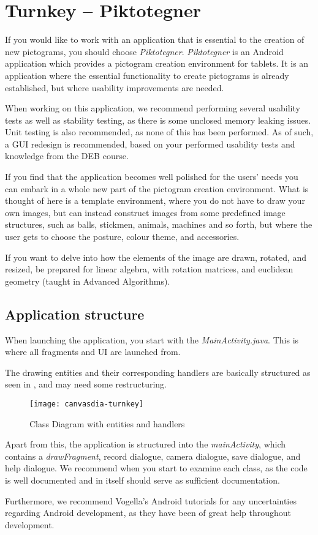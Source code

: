 \chapter{Turnkey -- Piktotegner}
If you would like to work with an application that is essential to the creation of new pictograms, you should choose \textit{Piktotegner}.
\textit{Piktotegner} is an Android application which provides a pictogram creation environment for tablets.
It is an application where the essential functionality to create pictograms is already established, but where usability improvements are needed.

When working on this application, we recommend performing several usability tests as well as stability testing, as there is some unclosed memory leaking issues.
Unit testing is also recommended, as none of this has been performed.
As of such, a GUI redesign is recommended, based on your performed usability tests and knowledge from the DEB course.

If you find that the application becomes well polished for the users' needs you can embark in a whole new part of the pictogram creation environment.
What is thought of here is a template environment, where you do not have to draw your own images, but can instead construct images from some predefined image structures, such as balls, stickmen, animals, machines and so forth, but where the user gets to choose the posture, colour theme, and accessories.

If you want to delve into how the elements of the image are drawn, rotated, and resized, be prepared for linear algebra, with rotation matrices, and euclidean geometry (taught in Advanced Algorithms).

\section{Application structure}
When launching the application, you start with the \textit{MainActivity.java}. 
This is where all fragments and UI are launched from.

The drawing entities and their corresponding handlers are basically structured as seen in , and may need some restructuring.

\begin{figure}[h]
     \centering
     \texttt{[image: canvasdia-turnkey]}
     \caption{Class Diagram with entities and handlers}
     \label{fig:turnkeydiacanvas}
\end{figure}

Apart from this, the application is structured into the \textit{mainActivity}, which contains a \textit{drawFragment}, record dialogue, camera dialogue, save dialogue, and help dialogue.
We recommend when you start to examine each class, as the code is well documented and in itself should serve as sufficient documentation.

Furthermore, we recommend Vogella's Android tutorials \citep{misc:vogella} for any uncertainties regarding Android development, as they have been of great help throughout development.